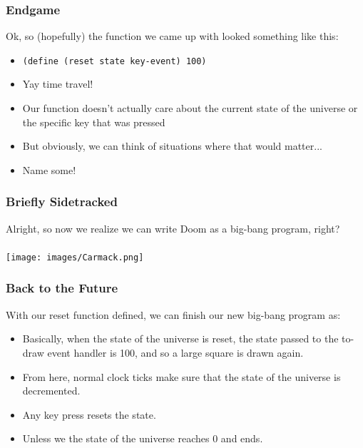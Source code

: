 \documentclass{beamer}
\begin{document}
\begin{frame}
  \frametitle{Endgame}
  Ok, so (hopefully) the function we came up with looked something like this:
  \begin{itemize}
  \item<2-> \texttt{(define (reset state key-event) 100)}
  \item<3-> Yay time travel!
  \item<4-> Our function doesn't actually care about the current state of the
    universe or the specific key that was pressed
  \item<5-> But obviously, we can think of situations where that would matter...
  \item<6-> Name some!
  \end{itemize}
\end{frame}

\begin{frame}
  \frametitle{Briefly Sidetracked}
  Alright, so now we realize we can write Doom as a big-bang program, right?
  \\\\
  \texttt{[image: images/Carmack.png]}
\end{frame}


\begin{frame}
  \frametitle{Back to the Future}
  With our reset function defined, we can finish our new big-bang
  program as:
  \pause
  \squareReset
  \begin{itemize}
  \item<3-> Basically, when the state of the universe is reset, the state
    passed to the to-draw event handler is 100, and so a large square is
    drawn again.
  \item<4-> From here, normal clock ticks make sure that the state of the universe
    is decremented.
  \item<5-> Any key press resets the state.
  \item<6-> Unless we the state of the universe reaches 0 and ends.
  \end{itemize}
\end{frame}
\end{document}
